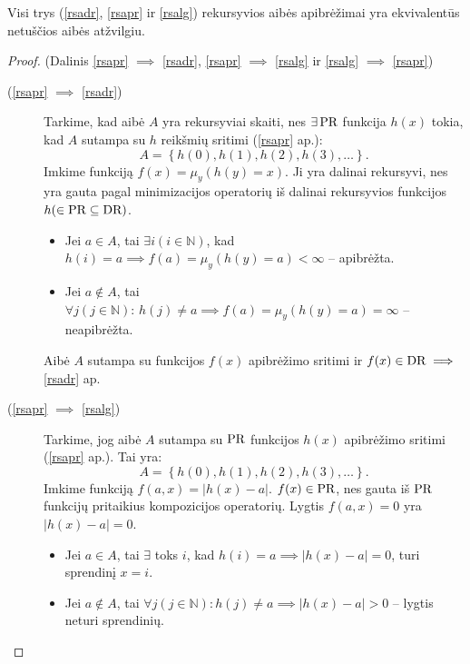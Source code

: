 \begin{prop}
  Visi trys (\ref{rsadr}, \ref{rsapr} ir \ref{rsalg}) rekursyvios aibės
  apibrėžimai yra ekvivalentūs netuščios aibės atžvilgiu.
  \begin{proof}
    (Dalinis \ref{rsapr} $\implies$ \ref{rsadr}, 
    \ref{rsapr} $\implies$ \ref{rsalg} ir 
    \ref{rsalg} $\implies$ \ref{rsapr})

    \begin{description}
      \item[(\ref{rsapr} $\implies$ \ref{rsadr})]
        Tarkime, kad aibė $A$ yra rekursyviai skaiti, nes $\exists \mathop{\text{PR}}$
        funkcija $h(x)$ tokia, kad $A$ sutampa su $h$ reikšmių 
        sritimi (\ref{rsapr} ap.):
        \[
        A = \left\{ h(0), h(1), h(2), h(3), \dotsc \right\}.
        \]
        Imkime funkciją $f(x) = \mu_{y}(h(y) = x)$. Ji yra dalinai 
        rekursyvi, nes yra gauta pagal minimizacijos operatorių iš
        dalinai rekursyvios funkcijos $h (\in \mathop{\text{PR}} \subseteq \mathop{\text{DR}})$.
        \begin{itemize}
          \item Jei $a \in A$, tai $\exists i(i \in \mathbb{N})$, kad
            $h(i) = a \implies f(a) = \mu_{y}(h(y) = a) < \infty$ 
            – apibrėžta.
          \item Jei $a \not \in A$, tai 
            $\forall j (j \in \mathbb{N}): \, h(j) \neq a \implies%
            f(a) = \mu_{y}(h(y) = a) = \infty$ – neapibrėžta.
        \end{itemize}
        Aibė $A$ sutampa su funkcijos $f(x)$ apibrėžimo sritimi ir
        $f(x) \in \mathop{\text{DR}} \implies$ \ref{rsadr} ap.
      \item[(\ref{rsapr} $\implies$ \ref{rsalg})] 
        Tarkime, jog aibė $A$ sutampa su $\mathop{\text{PR}}$ funkcijos
        $h(x)$ apibrėžimo sritimi (\ref{rsapr} ap.). Tai yra:
        \[
        A = \left\{ h(0),h(1),h(2),h(3),\dotsc \right\}.
        \]
        Imkime funkciją $f(a,x) = |h(x)-a|$. $f(x) \in \mathop{\text{PR}}$, nes gauta
        iš $\mathop{\text{PR}}$ funkcijų pritaikius kompozicijos operatorių. Lygtis
        $f(a,x) = 0$ yra $|h(x) - a| = 0$.
        \begin{itemize}
          \item Jei $a \in A$, tai $\exists$ toks $i$, kad 
            $h(i)=a \implies |h(x) - a| = 0$, turi sprendinį $x = i$.
          \item Jei $a \not \in A$, tai 
            $\forall j (j \in \mathbb{N}): h(j) \neq a \implies %
            |h(x) - a| > 0$ – lygtis neturi sprendinių.
        \end{itemize}

\end{description}
\end{proof}
\end{prop}
